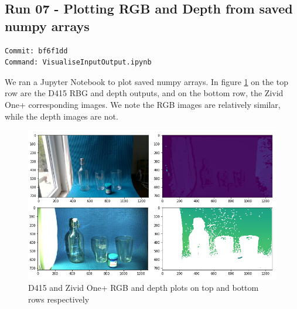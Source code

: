 \subsection{Run 07 - Plotting RGB and Depth from saved numpy arrays}
\label{app_res:07}
\begin{verbatim}
Commit: bf6f1dd
Command: VisualiseInputOutput.ipynb
\end{verbatim}
We ran a Jupyter Notebook to plot saved numpy arrays. In figure \ref{fig:D415-Zivid-RBG-Depth-From-Saved-Numpy-Arrays} on the top row are the D415 RBG and depth outputs, and on the bottom row, the Zivid One+ corresponding images. We note the RGB images are relatively similar, while the depth images are not.

\begin{figure}[h!]
\centering
\includegraphics[width=\textwidth]{Figures/D415-Zivid-RBG-Depth-From-Saved-Numpy-Arrays.png}
\caption{D415 and Zivid One+ RGB and depth plots on top and bottom rows respectively}
\label{fig:D415-Zivid-RBG-Depth-From-Saved-Numpy-Arrays}
\end{figure}

